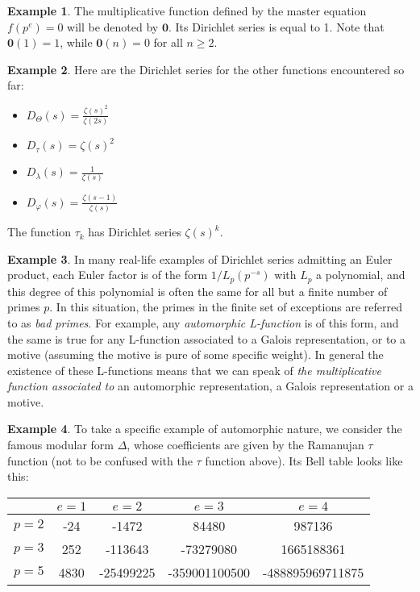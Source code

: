 \documentclass[a4paper]{article}
\theoremstyle{definition}
\newtheorem{example}{Example}[section]
\theoremstyle{remark}
\newcommand{\zero}{\mathbf{0}}
\begin{document}
\begin{example}
The multiplicative function defined by the master equation $f(p^e) = 0$ will be denoted by $\zero$. Its Dirichlet series is equal to 1. Note that $\zero(1) = 1$, while $\zero(n) = 0$ for all $n \geq 2$.
\end{example}

\begin{example}
Here are the Dirichlet series for the other functions encountered so far:
\begin{itemize}
\item $D_{\Theta}(s) = \frac{\zeta(s)^2}{\zeta(2s)}$
\item $D_{\tau}(s) = \zeta(s)^2$
\item $D_{\lambda}(s) = \frac{1}{\zeta(s)}$
\item $D_{\varphi}(s) = \frac{\zeta(s - 1)}{\zeta(s)}$
\end{itemize}
The function $\tau_k$ has Dirichlet series $\zeta(s)^k$.
\end{example}



\begin{example}
In many real-life examples of Dirichlet series admitting an Euler product, each Euler factor is of the form ${1} / {L_p(p^{-s})}$ with $L_p$ a polynomial, and this degree of this polynomial is often the same for all but a finite number of primes $p$. In this situation, the primes in the finite set of exceptions are referred to as \emph{bad primes}. For example, any \emph{automorphic L-function} is of this form, and the same is true for any L-function associated to a Galois representation, or to a motive (assuming the motive is pure of some specific weight). In general the existence of these L-functions means that we can speak of \emph{the multiplicative function associated to} an automorphic representation, a Galois representation or a motive.
\end{example}

\begin{example}
To take a specific example of automorphic nature, we consider the famous modular form $\Delta$, whose coefficients are given by the Ramanujan $\tau$ function (not to be confused with the $\tau$ function above). Its Bell table looks like this:
\vskip10pt
\begin{center}
\begin{tabular}{| l | | c | c | c | c |}
\hline
& $e = 1$ & $e = 2$ & $e = 3$ & $e = 4$ \\
\hline
\hline
$p = 2$ & -24 & -1472 & 84480 & 987136 \\
\hline
$p = 3$ & 252 & -113643 & -73279080 & 1665188361 \\
\hline
$p = 5$ & 4830 & -25499225 & -359001100500 & -488895969711875 \\
\hline
\end{tabular}
\end{center}



\end{example}
\end{document}
